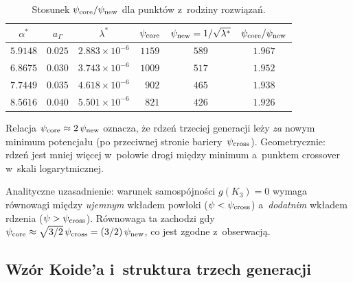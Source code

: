 \begin{table}[h]
\centering
\small
\caption{Stosunek $\psi_{\rm core}/\psi_{\rm new}$ dla punktów z~rodziny rozwiązań.}
\label{tab:psi-ratio}
\begin{tabular}{@{}cccccc@{}}
\toprule
$\alpha^*$ & $a_\Gamma$ & $\lambda^*$ & $\psi_{\rm core}$
    & $\psi_{\rm new} = 1/\sqrt{\lambda^*}$ & $\psi_{\rm core}/\psi_{\rm new}$ \\
\midrule
$5.9148$ & $0.025$ & $2.883\times10^{-6}$ & $1159$ & $589$ & $1.967$ \\
$6.8675$ & $0.030$ & $3.743\times10^{-6}$ & $1009$ & $517$ & $1.952$ \\
$7.7449$ & $0.035$ & $4.618\times10^{-6}$ & $\phantom{0}902$ & $465$ & $1.938$ \\
$8.5616$ & $0.040$ & $5.501\times10^{-6}$ & $\phantom{0}821$ & $426$ & $1.926$ \\
\bottomrule
\end{tabular}
\end{table}

\begin{remark}%
\label{rem:rdzen-minimum}
Relacja $\psi_{\rm core} \approx 2\,\psi_{\rm new}$ oznacza, że
rdzeń trzeciej generacji leży \emph{za} nowym minimum potencjału
(po przeciwnej stronie bariery~$\psi_{\rm cross}$).
Geometrycznie: rdzeń jest mniej więcej w~połowie drogi między
minimum a~punktem crossover w~skali logarytmicznej.

Analityczne uzasadnienie: warunek samospójności
$g(K_3) = 0$ wymaga równowagi między
\emph{ujemnym} wkładem powłoki ($\psi < \psi_{\rm cross}$)
a~\emph{dodatnim} wkładem rdzenia ($\psi > \psi_{\rm cross}$).
Równowaga ta zachodzi gdy $\psi_{\rm core} \approx \sqrt{3/2}\,\psi_{\rm cross}
= (3/2)\,\psi_{\rm new}$, co jest zgodne z~obserwacją.
\end{remark}

\subsection{Wzór Koide'a i~struktura trzech generacji}%
\label{app:I-koide}

